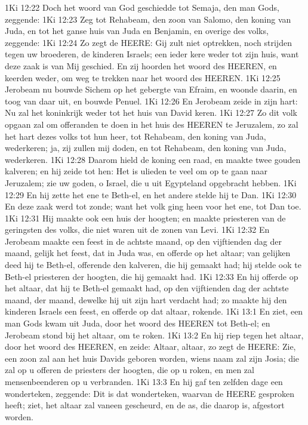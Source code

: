 1Ki 12:22  Doch het woord van God geschiedde tot Semaja, den man Gods, zeggende:
1Ki 12:23  Zeg tot Rehabeam, den zoon van Salomo, den koning van Juda, en tot het ganse huis van Juda en Benjamin, en overige des volks, zeggende:
1Ki 12:24  Zo zegt de HEERE: Gij zult niet optrekken, noch strijden tegen uw broederen, de kinderen Israels; een ieder kere weder tot zijn huis, want deze zaak is van Mij geschied. En zij hoorden het woord des HEEREN, en keerden weder, om weg te trekken naar het woord des HEEREN.
1Ki 12:25  Jerobeam nu bouwde Sichem op het gebergte van Efraim, en woonde daarin, en toog van daar uit, en bouwde Penuel.
1Ki 12:26  En Jerobeam zeide in zijn hart: Nu zal het koninkrijk weder tot het huis van David keren.
1Ki 12:27  Zo dit volk opgaan zal om offeranden te doen in het huis des HEEREN te Jeruzalem, zo zal het hart dezes volks tot hun heer, tot Rehabeam, den koning van Juda, wederkeren; ja, zij zullen mij doden, en tot Rehabeam, den koning van Juda, wederkeren.
1Ki 12:28  Daarom hield de koning een raad, en maakte twee gouden kalveren; en hij zeide tot hen: Het is ulieden te veel om op te gaan naar Jeruzalem; zie uw goden, o Israel, die u uit Egypteland opgebracht hebben.
1Ki 12:29  En hij zette het ene te Beth-el, en het andere stelde hij te Dan.
1Ki 12:30  En deze zaak werd tot zonde; want het volk ging heen voor het ene, tot Dan toe.
1Ki 12:31  Hij maakte ook een huis der hoogten; en maakte priesteren van de geringsten des volks, die niet waren uit de zonen van Levi.
1Ki 12:32  En Jerobeam maakte een feest in de achtste maand, op den vijftienden dag der maand, gelijk het feest, dat in Juda was, en offerde op het altaar; van gelijken deed hij te Beth-el, offerende den kalveren, die hij gemaakt had; hij stelde ook te Beth-el priesteren der hoogten, die hij gemaakt had.
1Ki 12:33  En hij offerde op het altaar, dat hij te Beth-el gemaakt had, op den vijftienden dag der achtste maand, der maand, dewelke hij uit zijn hart verdacht had; zo maakte hij den kinderen Israels een feest, en offerde op dat altaar, rokende.
1Ki 13:1  En ziet, een man Gods kwam uit Juda, door het woord des HEEREN tot Beth-el; en Jerobeam stond bij het altaar, om te roken.
1Ki 13:2  En hij riep tegen het altaar, door het woord des HEEREN, en zeide: Altaar, altaar, zo zegt de HEERE: Zie, een zoon zal aan het huis Davids geboren worden, wiens naam zal zijn Josia; die zal op u offeren de priesters der hoogten, die op u roken, en men zal mensenbeenderen op u verbranden.
1Ki 13:3  En hij gaf ten zelfden dage een wonderteken, zeggende: Dit is dat wonderteken, waarvan de HEERE gesproken heeft; ziet, het altaar zal vaneen gescheurd, en de as, die daarop is, afgestort worden.

